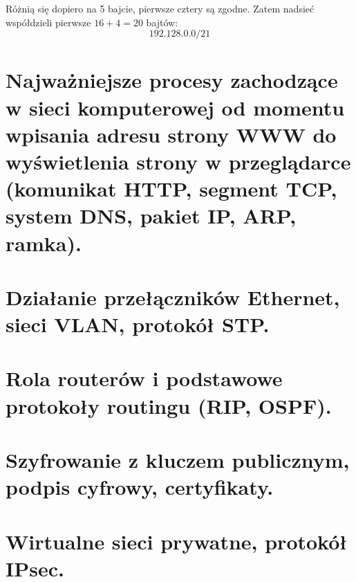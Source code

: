 \documentclass[12pt]{article}
\begin{document}
    Różnią się dopiero na 5 bajcie, pierwsze cztery są zgodne. Zatem nadsieć współdzieli pierwsze $16+4=20$ bajtów:
    \[192.128.0.0/21\]

    \newpage

    \section{Najważniejsze procesy zachodzące w sieci komputerowej od momentu wpisania adresu strony WWW do wyświetlenia strony w przeglądarce (komunikat HTTP, segment TCP, system DNS, pakiet IP, ARP, ramka).}
    \section{Działanie przełączników Ethernet, sieci VLAN, protokół STP.}
    \section{Rola routerów i podstawowe protokoły routingu (RIP, OSPF).}
    \section{Szyfrowanie z kluczem publicznym, podpis cyfrowy, certyfikaty.}
    \section{Wirtualne sieci prywatne, protokół IPsec.}
\end{document}
